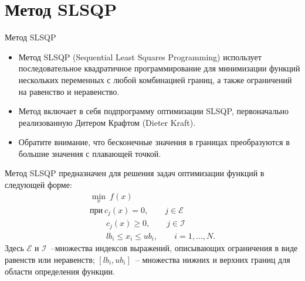 \documentclass[aspectratio=169, mathserif]{beamer}%
\begin{document}
\section{Метод SLSQP}
\begin{frame}[fragile, label=c]{Метод SLSQP}
\scriptsize
\begin{itemize}
\item Метод SLSQP (Sequential Least Squares Programming) использует последовательное квадратичное программирование для минимизации функций нескольких переменных с любой комбинацией границ, а также ограничений на равенство и неравенство.
\item Метод включает в себя подпрограмму оптимизации SLSQP, первоначально реализованную Дитером Крафтом (Dieter Kraft).
\item Обратите внимание, что бесконечные значения в границах преобразуются в большие значения с плавающей точкой.
\end{itemize}
\vfill
Метод SLSQP предназначен для решения задач оптимизации функций в следующей форме:
\vfill
\begin{equation}\label{eq:problem}
\begin{gathered}
\underset{x}{\min}\ f\left(x\right) \\
\mathrm{при }\ c_j\left(x\right) = 0, \qquad j \in \mathcal{E} \\
\qquad c_j\left(x\right) \geqslant 0, \qquad j \in \mathcal{I} \\
\qquad lb_i \leqslant x_i \leqslant ub_i, \qquad i = 1, \ldots , N.
\end{gathered}
\end{equation}
\vfill
Здесь $\mathcal{E}$ и $\mathcal{I}$~--множества индексов выражений, описывающих ограничения в виде равенств или неравенств; $\left[lb_i, ub_i\right]$~-- множества нижних и верхних границ для области определения функции.
\vfill
\end{frame}
\end{document}
